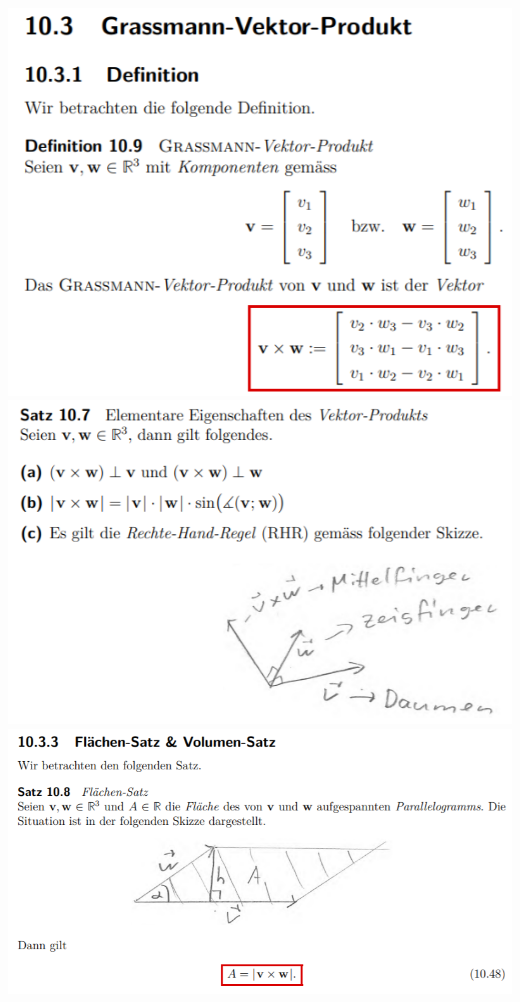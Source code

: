 \includegraphics[width=\columnwidth]{./images/vek15.png}
\includegraphics[width=\columnwidth]{./images/vek16.png}
\includegraphics[width=\columnwidth]{./images/vek17.png}
